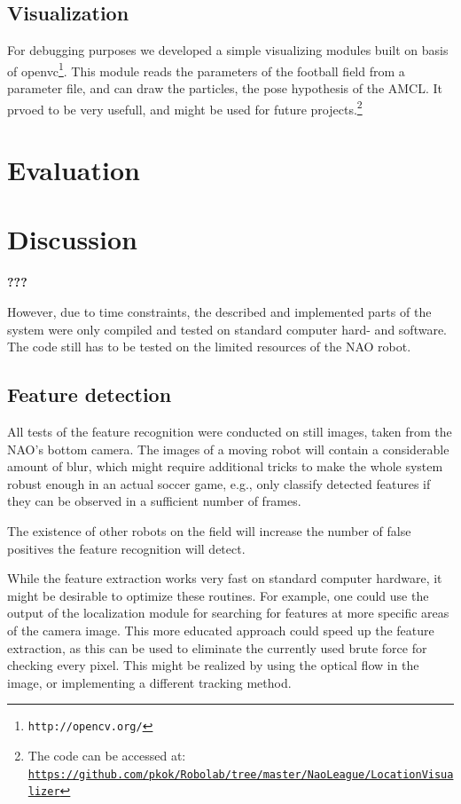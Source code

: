 \documentclass[	DIV=calc,%
							paper=a4,%
							fontsize=9pt,%
							twocolumn]{scrartcl}	 					%
\begin{document}
\subsection{Visualization}
For debugging purposes we developed a simple visualizing modules built on basis of openvc\footnote{\texttt{http://opencv.org/}}. This module reads the parameters of the football field from a parameter file, and can draw the particles, the pose hypothesis of the AMCL. It prvoed to be very usefull, and might be used for future projects.\footnote{The code can be accessed at: \texttt{\url{https://github.com/pkok/Robolab/tree/master/NaoLeague/LocationVisualizer}}}

\section{Evaluation}
\label{sec:Evaluation}

\section{Discussion}
\label{sec:Discussion}
\textbf{???}

However, due to time constraints, the described and implemented parts of the system were only compiled and tested on standard computer hard- and software. The code still has to be tested on the limited resources of the NAO robot.

\subsection{Feature detection}
All tests of the feature recognition were conducted on still images, taken from the NAO's bottom camera. The images of a moving robot will contain a considerable amount of blur, which might require additional tricks to make the whole system robust enough in an actual soccer game, e.g., only classify detected features if they can be observed in a sufficient number of frames.

The existence of other robots on the field will increase the number of false positives the feature recognition will detect.

While the feature extraction works very fast on standard computer hardware, it might be desirable to optimize these routines. For example, one could use the output of the localization module for searching for features at more specific areas of the camera image.  This more educated approach could speed up the feature extraction, as this can be used to eliminate the currently used brute force for checking every pixel.  This might be realized by using the optical flow in the image, or implementing a different tracking method.
\end{document}
